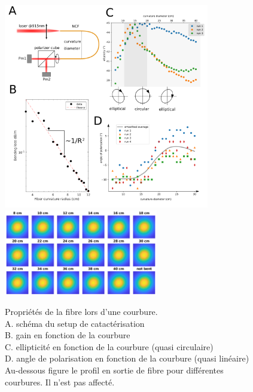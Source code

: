 \begin{figure}
\centering
\includegraphics[width=0.8\textwidth]{./files/fiber_bending.png}
\includegraphics[width=0.6\textwidth]{./files/beam_profile.png}
\caption{Propriétés de la fibre lors d'une courbure.
\\ A. schéma du setup de catactérisation
\\ B. gain en fonction de la courbure
\\ C. ellipticité en fonction de la courbure (quasi circulaire)
\\ D. angle de polarisation en fonction de la courbure (quasi linéaire)
\\ Au-dessous figure le profil en sortie de fibre pour différentes courbures. Il n'est pas affecté.
\label{FIGfibercarac}}
\end{figure}



